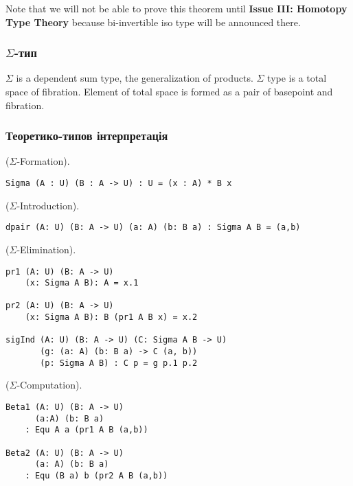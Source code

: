 Note that we will not be able to prove this theorem
until \textbf{Issue III: Homotopy Type Theory} because
bi-invertible iso type will be announced there.

\subsubsection{$\Sigma$-тип}

$\Sigma$ is a dependent sum type, the generalization of products.
$\Sigma$ type is a total space of fibration. Element of total
space is formed as a pair of basepoint and fibration.

\subsubsection{Теоретико-типов інтерпретація}

\begin{definition} ($\Sigma$-Formation).
\begin{lstlisting}
Sigma (A : U) (B : A -> U) : U = (x : A) * B x
\end{lstlisting}
\end{definition}

\begin{definition} ($\Sigma$-Introduction).
\begin{lstlisting}
dpair (A: U) (B: A -> U) (a: A) (b: B a) : Sigma A B = (a,b)
\end{lstlisting}
\end{definition}

\begin{definition} ($\Sigma$-Elimination).
\begin{lstlisting}
pr1 (A: U) (B: A -> U)
    (x: Sigma A B): A = x.1

pr2 (A: U) (B: A -> U)
    (x: Sigma A B): B (pr1 A B x) = x.2

sigInd (A: U) (B: A -> U) (C: Sigma A B -> U)
       (g: (a: A) (b: B a) -> C (a, b))
       (p: Sigma A B) : C p = g p.1 p.2
\end{lstlisting}
\end{definition}

\begin{theorem} ($\Sigma$-Computation).
\begin{lstlisting}
Beta1 (A: U) (B: A -> U)
      (a:A) (b: B a)
    : Equ A a (pr1 A B (a,b))

Beta2 (A: U) (B: A -> U)
      (a: A) (b: B a)
    : Equ (B a) b (pr2 A B (a,b))
\end{lstlisting}
\end{theorem}

